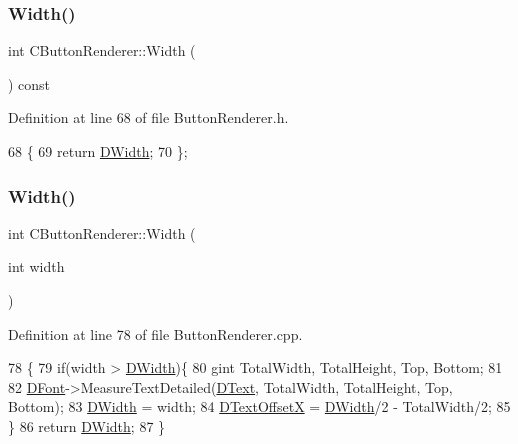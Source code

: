 \subsubsection{\texorpdfstring{Width()}{Width()}\hspace{0.1cm}{\footnotesize\ttfamily [1/2]}}
{\footnotesize\ttfamily int C\+Button\+Renderer\+::\+Width (\begin{DoxyParamCaption}{ }\end{DoxyParamCaption}) const\hspace{0.3cm}{\ttfamily [inline]}}



Definition at line 68 of file Button\+Renderer.\+h.


\begin{DoxyCode}
68                          \{
69             \textcolor{keywordflow}{return} \hyperlink{classCButtonRenderer_a5c2ce68af06e91c14cbd1b8dd8bd4b94}{DWidth};
70         \};
\end{DoxyCode}
\hypertarget{classCButtonRenderer_ace9959d559850f1b916e1a949f25e21f}{}\label{classCButtonRenderer_ace9959d559850f1b916e1a949f25e21f} 
\subsubsection{\texorpdfstring{Width()}{Width()}\hspace{0.1cm}{\footnotesize\ttfamily [2/2]}}
{\footnotesize\ttfamily int C\+Button\+Renderer\+::\+Width (\begin{DoxyParamCaption}\item[{int}]{width }\end{DoxyParamCaption})}



Definition at line 78 of file Button\+Renderer.\+cpp.


\begin{DoxyCode}
78                                    \{
79     \textcolor{keywordflow}{if}(width > \hyperlink{classCButtonRenderer_a5c2ce68af06e91c14cbd1b8dd8bd4b94}{DWidth})\{
80         gint TotalWidth, TotalHeight, Top, Bottom;
81         
82         \hyperlink{classCButtonRenderer_adcdace35cb4fac1c90368b7cc86d860a}{DFont}->MeasureTextDetailed(\hyperlink{classCButtonRenderer_a8f058166dec8d1c73adc009e4c436092}{DText}, TotalWidth, TotalHeight, Top, Bottom);
83         \hyperlink{classCButtonRenderer_a5c2ce68af06e91c14cbd1b8dd8bd4b94}{DWidth} = width;  
84         \hyperlink{classCButtonRenderer_aaeb649ff53e0032e756c53b2f51f3d96}{DTextOffsetX} = \hyperlink{classCButtonRenderer_a5c2ce68af06e91c14cbd1b8dd8bd4b94}{DWidth}/2 - TotalWidth/2;
85     \}
86     \textcolor{keywordflow}{return} \hyperlink{classCButtonRenderer_a5c2ce68af06e91c14cbd1b8dd8bd4b94}{DWidth};
87 \}
\end{DoxyCode}


